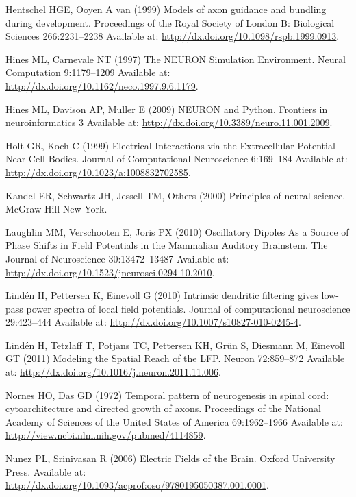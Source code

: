 \documentclass[]{article}
\begin{document}
\hypertarget{ref-Hentschel1999Models}{}
Hentschel HGE, Ooyen A van (1999) Models of axon guidance and bundling
during development. Proceedings of the Royal Society of London B:
Biological Sciences 266:2231--2238 Available at:
\url{http://dx.doi.org/10.1098/rspb.1999.0913}.

\hypertarget{ref-Hines1997NEURON}{}
Hines ML, Carnevale NT (1997) The NEURON Simulation Environment. Neural
Computation 9:1179--1209 Available at:
\url{http://dx.doi.org/10.1162/neco.1997.9.6.1179}.

\hypertarget{ref-Hines2009NEURON}{}
Hines ML, Davison AP, Muller E (2009) NEURON and Python. Frontiers in
neuroinformatics 3 Available at:
\url{http://dx.doi.org/10.3389/neuro.11.001.2009}.

\hypertarget{ref-Holt1999Electrical}{}
Holt GR, Koch C (1999) Electrical Interactions via the Extracellular
Potential Near Cell Bodies. Journal of Computational Neuroscience
6:169--184 Available at:
\url{http://dx.doi.org/10.1023/a:1008832702585}.

\hypertarget{ref-kandel2000principles}{}
Kandel ER, Schwartz JH, Jessell TM, Others (2000) Principles of neural
science. McGraw-Hill New York.

\hypertarget{ref-Laughlin2010Oscillatory}{}
Laughlin MM, Verschooten E, Joris PX (2010) Oscillatory Dipoles As a
Source of Phase Shifts in Field Potentials in the Mammalian Auditory
Brainstem. The Journal of Neuroscience 30:13472--13487 Available at:
\url{http://dx.doi.org/10.1523/jneurosci.0294-10.2010}.

\hypertarget{ref-Linden2010Intrinsic}{}
Lindén H, Pettersen K, Einevoll G (2010) Intrinsic dendritic filtering
gives low-pass power spectra of local field potentials. Journal of
computational neuroscience 29:423--444 Available at:
\url{http://dx.doi.org/10.1007/s10827-010-0245-4}.

\hypertarget{ref-Linden2011Modeling}{}
Lindén H, Tetzlaff T, Potjans TC, Pettersen KH, Grün S, Diesmann M,
Einevoll GT (2011) Modeling the Spatial Reach of the LFP. Neuron
72:859--872 Available at:
\url{http://dx.doi.org/10.1016/j.neuron.2011.11.006}.

\hypertarget{ref-Nornes1972Temporal}{}
Nornes HO, Das GD (1972) Temporal pattern of neurogenesis in spinal
cord: cytoarchitecture and directed growth of axons. Proceedings of the
National Academy of Sciences of the United States of America
69:1962--1966 Available at:
\url{http://view.ncbi.nlm.nih.gov/pubmed/4114859}.

\hypertarget{ref-Nunez2006Electric}{}
Nunez PL, Srinivasan R (2006) Electric Fields of the Brain. Oxford
University Press. Available at:
\url{http://dx.doi.org/10.1093/acprof:oso/9780195050387.001.0001}.
\end{document}
